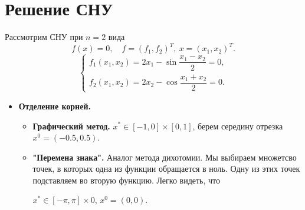 \documentclass[a4paper, 12pt]{article}
\begin{document}
	\section*{Решение СНУ}
	Рассмотрим СНУ при $n=2$ вида $$f(x) = 0,\quad f=(f_1, f_2)^T,\ x=(x_1,x_2)^T.$$
	$$\begin{cases}
		f_1(x_1,x_2) = 2x_1 - \sin \dfrac{x_1-x_2}{2} = 0,\\
		f_2(x_1,x_2) = 2x_2 - \cos\dfrac{x_1+x_2}{2} = 0.
	\end{cases}$$
	\begin{itemize}
		\item \textbf{Отделение корней.}
		\begin{itemize}
			\item \textbf{Графический метод.}
			$x^* \in [-1, 0]\times[0, 1]$, берем середину отрезка $x^0 = (-0.5, 0.5)$.
			\item \textbf{"Перемена знака".}
			Аналог метода дихотомии. Мы выбираем множетсво точек, в которых одна из функции обращается в ноль. Одну из этих точек подставляем во вторую функцию. Легко видеть, что
			
			$x^* \in [-\pi ,\pi ]\times 0$, $x^0 = (0,0)$.
			

\end{itemize}
\end{itemize}
\end{document}
